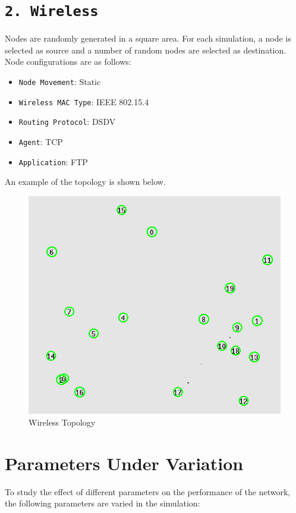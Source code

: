 \documentclass[10pt]{report}
\begin{document}
\section*{\textbf{\texttt{2. Wireless}}}
Nodes are randomly generated in a square area. For each simulation, a node is selected as source and a number of random nodes are selected as destination. Node configurations are as follows:

\begin{itemize}
  \item \texttt{Node Movement}: Static
  \item \texttt{Wireless MAC Type}: IEEE 802.15.4
  \item \texttt{Routing Protocol}: DSDV
  \item \texttt{Agent}: TCP
  \item \texttt{Application}: FTP
\end{itemize}

An example of the topology is shown below.

\begin{figure}[h]
    \centering
    \includegraphics[scale=0.6]{static/images/wireless_topology.png}
    \caption{Wireless Topology}
    \label{fig:my_label}
\end{figure}

\section*{Parameters Under Variation}
To study the effect of different parameters on the performance of the network, the following parameters are varied in the simulation:
\end{document}
